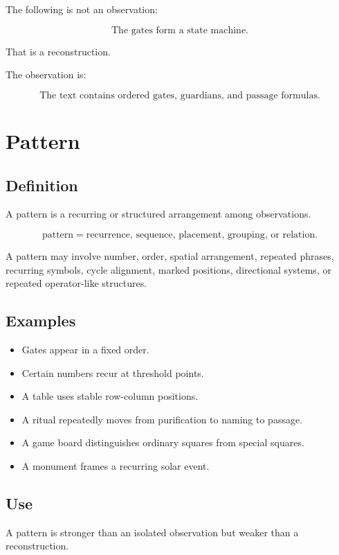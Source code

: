 \documentclass[11pt]{book}
\begin{document}
The following is not an observation:

\[
\text{The gates form a state machine.}
\]

That is a reconstruction.

The observation is:

\[
\text{The text contains ordered gates, guardians, and passage formulas.}
\]

\section{Pattern}

\subsection{Definition}

A pattern is a recurring or structured arrangement among observations.

\[
\text{pattern} = \text{recurrence, sequence, placement, grouping, or relation}.
\]

A pattern may involve number, order, spatial arrangement, repeated phrases, recurring symbols, cycle alignment, marked positions, directional systems, or repeated operator-like structures.

\subsection{Examples}

\begin{itemize}
    \item Gates appear in a fixed order.
    \item Certain numbers recur at threshold points.
    \item A table uses stable row-column positions.
    \item A ritual repeatedly moves from purification to naming to passage.
    \item A game board distinguishes ordinary squares from special squares.
    \item A monument frames a recurring solar event.
\end{itemize}

\subsection{Use}

A pattern is stronger than an isolated observation but weaker than a reconstruction.
\end{document}
